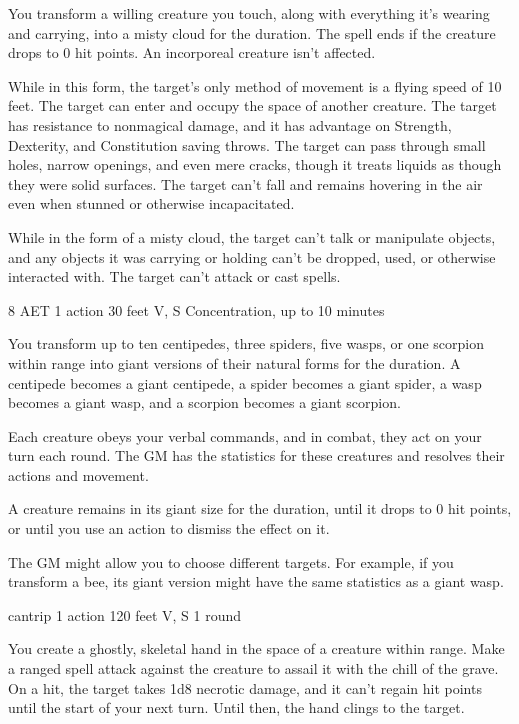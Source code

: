 You transform a willing creature you touch, along with everything it's wearing and carrying, into a misty cloud for the duration. The spell ends if the creature drops to 0 hit points. An incorporeal creature isn't affected.

While in this form, the target's only method of movement is a flying speed of 10 feet. The target can enter and occupy the space of another creature. The target has resistance to nonmagical damage, and it has advantage on Strength, Dexterity, and Constitution saving throws. The target can pass through small holes, narrow openings, and even mere cracks, though it treats liquids as though they were solid surfaces. The target can't fall and remains hovering in the air even when stunned or otherwise incapacitated.

While in the form of a misty cloud, the target can't talk or manipulate objects, and any objects it was carrying or holding can't be dropped, used, or otherwise interacted with. The target can't attack or cast spells.


{8 AET}
{1 action}
{30 feet}
{V, S}
{Concentration, up to 10 minutes}

You transform up to ten centipedes, three spiders, five wasps, or one scorpion within range into giant versions of their natural forms for the duration. A centipede becomes a giant centipede, a spider becomes a giant spider, a wasp becomes a giant wasp, and a scorpion becomes a giant scorpion.

Each creature obeys your verbal commands, and in combat, they act on your turn each round. The GM has the statistics for these creatures and resolves their actions and movement.

A creature remains in its giant size for the duration, until it drops to 0 hit points, or until you use an action to dismiss the effect on it.

The GM might allow you to choose different targets. For example, if you transform a bee, its giant version might have the same statistics as a giant wasp.


{cantrip}
{1 action}
{120 feet}
{V, S}
{1 round}

You create a ghostly, skeletal hand in the space of a creature within range. Make a ranged spell attack against the creature to assail it with the chill of the grave. On a hit, the target takes 1d8 necrotic damage, and it can't regain hit points until the start of your next turn. Until then, the hand clings to the target.

